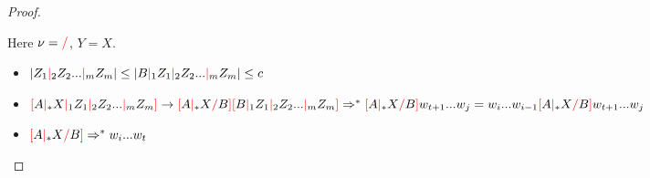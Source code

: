 \documentclass[12pt]{extarticle}
\theoremstyle{definition} \newtheorem{defn}{Definition}
\theoremstyle{definition} \newtheorem{prop}{Proposition}
\newcommand{\rc}{\textcolor{red}{/}}
\newcommand{\mc}{\textcolor{red}{|}}
\newcommand{\lb}{\textcolor{red}{[}}
\newcommand{\rb}{\textcolor{red}{]}}
\begin{document}
\begin{proof}
\begin{enumerate}
        Here $\nu = \rc$, $Y = X$.
        \begin{itemize}
            \item $|Z_1 \mc_2 Z_2 ... \mc_m Z_m| \leq |B \mc_1 Z_1 \mc_2 Z_2 ... \mc_m Z_m| \leq c$
            \item $
                \lb A \mc_* X \mc_1 Z_1 \mc_2 Z_2 ... \mc_m Z_m \rb
                \rightarrow
                \lb A \mc_* X \rc B \rb \lb B \mc_1 Z_1 \mc_2 Z_2 ... \mc_m Z_m \rb
                \\
                \Rightarrow^* \lb A \mc_* X \rc B \rb w_{t + 1} ... w_j
                = w_i ... w_{i - 1} \lb A \mc_* X \rc B \rb w_{t + 1} ... w_j
                $
            \item $\lb A \mc_* X \rc B \rb \Rightarrow^* w_i ... w_t$
        \end{itemize}

    \iffalse
    \fi
    \end{enumerate}
\end{proof}
\end{document}
